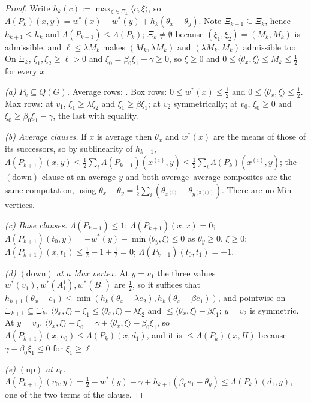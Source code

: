 \begin{proof}
Write $h_k(c):=\max_{\xi\in\Xi_k}\langle c,\xi\rangle$, so
$\Lambda(P_k)(x,y)=w^\ast(x)-w^\ast(y)+h_k(\theta_x-\theta_y)$. Note
$\Xi_{k+1}\subseteq\Xi_k$, hence $h_{k+1}\le h_k$ and
$\Lambda(P_{k+1})\le\Lambda(P_k)$; $\Xi_k\ne\emptyset$ because
$(\xi_1,\xi_2)=(M_k,M_k)$ is admissible, and $\ell\le\lambda M_k$ makes
$(M_k,\lambda M_k)$ and $(\lambda M_k,M_k)$ admissible too. On $\Xi_k$,
$\xi_1,\xi_2\ge\ell>0$ and $\xi_0=\beta_0\xi_1-\gamma\ge0$, so $\xi\ge0$ and
$0\le\langle\theta_x,\xi\rangle\le M_k\le\tfrac12$ for every $x$.

\emph{(a) $P_k\subseteq Q(G)$.} Average rows: . Box rows:
$0\le w^\ast(x)\le\tfrac12$ and $0\le\langle\theta_x,\xi\rangle\le\tfrac12$.
Max rows: at $v_1$, $\xi_1\ge\lambda\xi_2$ and $\xi_1\ge\beta\xi_1$; at $v_2$
symmetrically; at $v_0$, $\xi_0\ge0$ and $\xi_0\ge\beta_0\xi_1-\gamma$, the
last with equality.

\emph{(b) Average clauses.} If $x$ is average then $\theta_x$ and $w^\ast(x)$
are the means of those of its successors, so by sublinearity of $h_{k+1}$,
$\Lambda(P_{k+1})(x,y)\le\tfrac12\sum_i\Lambda(P_{k+1})(x^{(i)},y)
\le\tfrac12\sum_i\Lambda(P_k)(x^{(i)},y)$; the $(\mathrm{down})$ clause at an
average $y$ and both average--average composites are the same computation,
using $\theta_x-\theta_y=\tfrac12\sum_i(\theta_{x^{(i)}}-\theta_{y^{(\pi(i))}})$.
There are no Min vertices.

\emph{(c) Base clauses.} $\Lambda(P_{k+1})\le1$;
$\Lambda(P_{k+1})(x,x)=0$;
$\Lambda(P_{k+1})(t_0,y)=-w^\ast(y)-\min\langle\theta_y,\xi\rangle\le0$ as
$\theta_y\ge0$, $\xi\ge0$; $\Lambda(P_{k+1})(x,t_1)\le\tfrac12-1+\tfrac12=0$;
$\Lambda(P_{k+1})(t_0,t_1)=-1$.

\emph{(d) $(\mathrm{down})$ at a Max vertex.} At $y=v_1$ the three values
$w^\ast(v_1),w^\ast(A^{1}_1),w^\ast(B^{1}_1)$ are $\tfrac12$, so it suffices
that $h_{k+1}(\theta_x-e_1)\le\min(h_k(\theta_x-\lambda e_2),
h_k(\theta_x-\beta e_1))$, and pointwise on $\Xi_{k+1}\subseteq\Xi_k$,
$\langle\theta_x,\xi\rangle-\xi_1\le\langle\theta_x,\xi\rangle-\lambda\xi_2$
and $\le\langle\theta_x,\xi\rangle-\beta\xi_1$; $y=v_2$ is symmetric. At
$y=v_0$, $\langle\theta_x,\xi\rangle-\xi_0=\gamma+\langle\theta_x,\xi\rangle
-\beta_0\xi_1$, so $\Lambda(P_{k+1})(x,v_0)\le\Lambda(P_k)(x,d_1)$, and it is
$\le\Lambda(P_k)(x,H)$ because $\gamma-\beta_0\xi_1\le0$ for $\xi_1\ge\ell$.

\emph{(e) $(\mathrm{up})$ at $v_0$.} $\Lambda(P_{k+1})(v_0,y)
=\tfrac12-w^\ast(y)-\gamma+h_{k+1}(\beta_0e_1-\theta_y)\le\Lambda(P_k)(d_1,y)$,
one of the two terms of the clause.


\end{proof}
